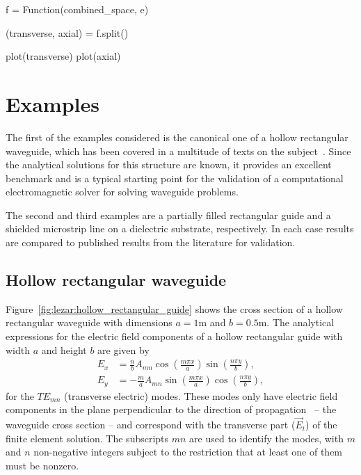 \pagebreak

\begin{python}
f = Function(combined_space, e)

(transverse, axial) = f.split()

plot(transverse)
plot(axial)
\end{python}

\section{Examples}
\label{lezar:sec:Examples}

The first of the examples considered is the canonical one of a hollow
rectangular waveguide, which has been covered in a multitude of texts
on the subject~\citep{Davidson2011, Jin2002,
PelosiCoccioliSelleri1998, Pozar2005}. Since the analytical solutions
for this structure are known, it provides an excellent benchmark and
is a typical starting point for the validation of a computational
electromagnetic solver for solving waveguide problems.

The second and third examples are a partially filled rectangular guide
and a shielded microstrip line on a dielectric substrate,
respectively. In each case results are compared to published results
from the literature for validation.

\subsection{Hollow rectangular waveguide}

Figure~\ref{fig:lezar:hollow_rectangular_guide} shows the cross
section of a hollow rectangular waveguide with dimensions
$a = 1\text{m}$ and $b = 0.5\text{m}$.
The analytical expressions for the electric field
components of a hollow rectangular guide with width $a$ and height $b$
are given by~\citep{Pozar2005}
\begin{align}
    \label{eq:lezar:rect:E_x analytical}
    E_x &= \frac{n}{b}A_{mn}\cos\left(\frac{m\pi
    x}{a}\right)\sin\left(\frac{n\pi y}{b}\right),\\
    \label{eq:lezar:rect:E_y analytical}
    E_y &= -\frac{m}{a}A_{mn}\sin\left(\frac{m\pi x}{a}\right)\cos\left(\frac{n\pi y}{b}\right),
\end{align}
for the $TE_{mn}$ (transverse electric) modes. These modes only have
electric field components in the plane perpendicular to the direction of propagation~\citep{Pozar2005} -- the waveguide cross section -- and
correspond with the transverse part ($\vec{E}_t$) of the finite
element solution. The subscripts $mn$ are used to identify the modes,
with $m$ and $n$ non-negative integers subject to the restriction that
at least one of them must be nonzero.

